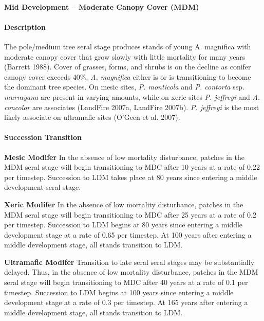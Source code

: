 \noindent\hrulefill

\paragraph{Mid Development – Moderate Canopy Cover (MDM)}

\paragraph{Description} The pole/medium tree seral stage produces stands of young A. magnifica with moderate canopy cover that grow slowly with little mortality for many years (Barrett 1988). Cover of grasses, forms, and shrubs is on the decline as conifer canopy cover exceeds 40\%. \emph{A. magnifica} either is or is transitioning to become the dominant tree species. On mesic sites, \emph{P. monticola} and \emph{P. contorta} ssp. \emph{murrayana} are present in varying amounts, while on xeric sites \emph{P. jeffreyi} and \emph{A. concolor} are associates (LandFire 2007a, LandFire 2007b). \emph{P. jeffreyi} is the most likely associate on ultramafic sites (O’Geen et al. 2007).

\paragraph{Succession Transition}
\begin{adjustwidth}{2cm}{}
\textbf{Mesic Modifer } In the absence of low mortality disturbance, patches in the MDM seral stage will begin transitioning to MDC after 10 years at a rate of 0.22 per timestep. Succession to LDM takes place at 80 years since entering a middle development seral stage. 

\textbf{Xeric Modifer}  In the absence of low mortality disturbance, patches in the MDM seral stage will begin transitioning to MDC after 25 years at a rate of 0.2 per timestep. Succession to LDM begins at 80 years since entering a middle development stage at a rate of 0.65 per timestep. At 100 years after entering a middle development stage, all stands transition to LDM. 

\textbf{Ultramafic Modifer} Transition to late seral seral stages may be substantially delayed. Thus, in the absence of low mortality disturbance, patches in the MDM seral stage will begin transitioning to MDC after 40 years at a rate of 0.1 per timestep. Succession to LDM begins at 100 years since entering a middle development stage at a rate of 0.3 per timestep. At 165 years after entering a middle development stage, all stands transition to LDM. 

\end{adjustwidth}

